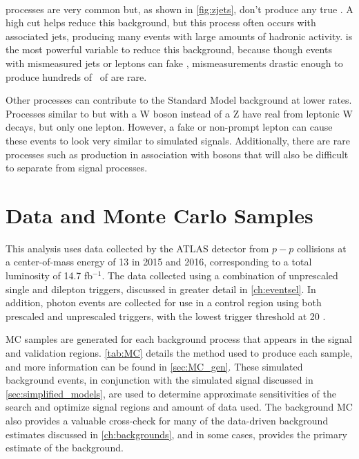 \paragraph{\dyjets} processes are very common but, as shown in \autoref{fig:zjets}, don't produce any true \MET. A high \HT cut helps reduce this background, but this process often occurs with associated jets, producing many events with large amounts of hadronic activity. \MET is the most powerful variable to reduce this background, because though events with mismeasured jets or leptons can fake \MET, mismeasurements drastic enough to produce hundreds of \gev~of \met are rare. 

Other processes can contribute to the Standard Model background at lower rates. Processes similar to \dyjets but with a W boson instead of a Z have real \MET from leptonic W decays, but only one lepton. However, a fake or non-prompt lepton can cause these events to look very similar to simulated signals. Additionally, there are rare processes such as \ttbar production in association with bosons that will also be difficult to separate from signal processes.

\section{Data and Monte Carlo Samples} 

This analysis uses data collected by the ATLAS detector from $p-p$ collisions at a center-of-mass energy of 13 \tev in 2015 and 2016, corresponding to a total luminosity of 14.7 fb$^{-1}$. The data collected using a combination of unprescaled single and dilepton triggers, discussed in greater detail in \autoref{ch:eventsel}. In addition, photon events are collected for use in a control region using both prescaled and unprescaled triggers, with the lowest trigger threshold at 20 \gev. 

\ac{MC} samples are generated for each background process that appears in the signal and validation regions. \autoref{tab:MC} details the method used to produce each sample, and more information can be found in \autoref{sec:MC_gen}. These simulated background events, in conjunction with the simulated signal discussed in \autoref{sec:simplified_models}, are used to determine approximate sensitivities of the search and optimize signal regions and amount of data used. The background \ac{MC} also provides a valuable cross-check for many of the data-driven background estimates discussed in \autoref{ch:backgrounds}, and in some cases, provides the primary estimate of the background.

